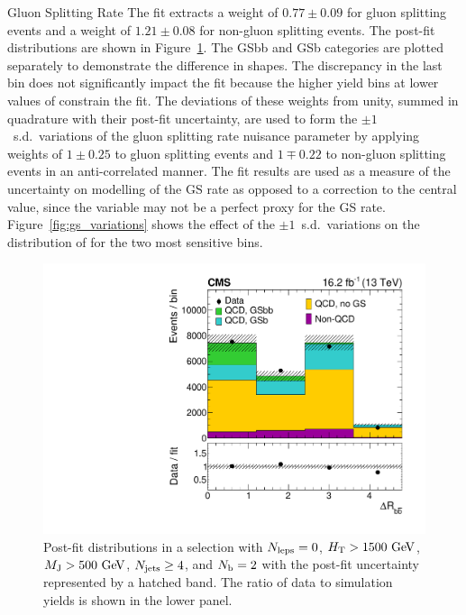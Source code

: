 \begin{section}{Gluon Splitting Rate}
The \dRbb fit extracts a weight of $0.77 \pm 0.09$ for gluon splitting events and a weight of $1.21 \pm 0.08$ for non-gluon splitting events.
The post-fit distributions are shown in Figure~\ref{fig:gs_fitresult}.
The GSbb and GSb categories are plotted separately to demonstrate the difference in shapes.
The discrepancy in the last bin does not significantly impact the fit because the higher yield bins at lower values of \dRbb constrain the fit.
The deviations of these weights from unity, summed in quadrature with their post-fit uncertainty, are used to form the $\pm 1$~s.d.\ variations of the gluon splitting rate nuisance parameter by applying weights of $1 \pm 0.25$ to gluon splitting events and $1 \mp 0.22$ to non-gluon splitting events in an anti-correlated manner.
The fit results are used as a measure of the uncertainty on modelling of the GS rate as opposed to a correction to the central value, since the \dRbb  variable may not be a perfect proxy for the GS rate.
Figure~\ref{fig:gs_variations} shows the effect of the $\pm 1$~s.d.\ variations on the \Nb distribution of \ttbar for the two most sensitive bins.

\begin{figure}[tbp!]
\begin{center}
\includegraphics[angle=0,width=0.60\columnwidth]{fig/gs_fitresult.pdf}
\end{center}
\caption{Post-fit \dRbb distributions in a selection with  $N_{\mathrm{leps}} = 0$, $H_{\mathrm{T}} > 1500~\mathrm{Ge\kern -0.1em V}$, $M_{\mathrm{J}} > 500~\mathrm{Ge\kern -0.1em V}$, $N_{\mathrm{jets}} \geq 4$, and $N_{\mathrm{b}} = 2$ with the post-fit uncertainty represented by a hatched band.
The ratio of data to simulation yields is shown in the lower panel.}
\label{fig:gs_fitresult}
\end{figure}


\end{section}
